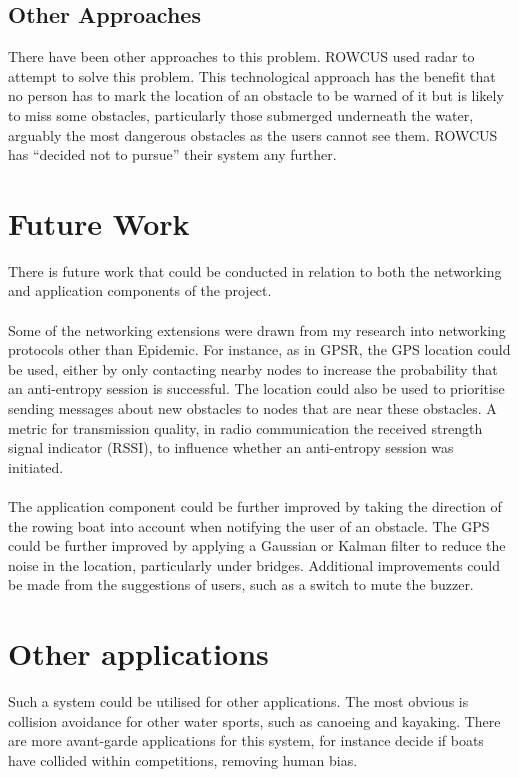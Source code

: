 \documentclass[12pt,a4paper]{report}
\begin{document}
{\subsection{Other Approaches}
There have been other approaches to this problem. ROWCUS used radar to attempt to solve this problem. This technological approach has the benefit that no person has to mark the location of an obstacle to be warned of it but is likely to miss some obstacles, particularly those submerged underneath the water, arguably the most dangerous obstacles as the users cannot see them. ROWCUS has ``decided not to pursue'' their system any further.

\section{Future Work}
There is future work that could be conducted in relation to both the networking and application components of the project. \\ \\
Some of the networking extensions were drawn from my research into networking protocols other than Epidemic. For instance, as in GPSR, the GPS location could be used, either by only contacting nearby nodes to increase the probability that an anti-entropy session is successful. The location could also be used to prioritise sending messages about new obstacles to nodes that are near these obstacles.  A metric for transmission quality, in radio communication the received strength signal indicator (RSSI), to influence whether an anti-entropy session was initiated. \\ \\ 
The application component could be further improved by taking the direction of the rowing boat into account when notifying the user of an obstacle. The GPS could be further improved by applying a Gaussian or Kalman filter to reduce the noise in the location, particularly under bridges. Additional improvements could be made from the suggestions of users, such as a switch to mute the buzzer. 

\section{Other applications}
Such a system could be utilised for other applications. The most obvious is collision avoidance for other water sports, such as canoeing and kayaking. There are more avant-garde applications for this system, for instance decide if boats have collided within competitions, removing human bias. %

}
\end{document}
